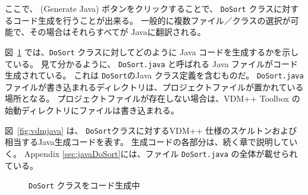 \documentclass[\pformat,11pt]{jarticle}
\newcommand{\guicmd}[1]{{\sf #1}}
\begin{document}
ここで、 
(\guicmd{Generate Java}) ボタンをクリックすることで、 {\tt DoSort} クラスに対するコード生成を行うことが出来る。
一般的に複数ファイル／クラスの選択が可能で、その場合はそれらすべてが Javaに翻訳される。

図~\ref{fig:interpreter} では、{\tt DoSort} クラスに対してどのように Java コードを生成するかを示している。
見て分かるように、 {\tt  DoSort.java} と呼ばれる Java ファイルがコード生成されている。
これは {\tt DoSort}のJava クラス定義を含むものだ。
 {\tt DoSort.java} ファイルが書き込まれるディレクトリは、プロジェクトファイルが置かれている場所となる。
プロジェクトファイルが存在しない場合は、VDM++ Toolbox の始動ディレクトリにファイルは書き込まれる。

図~\ref{fig:vdmjava} は、 {\tt DoSort}クラスに対するVDM++ 仕様のスケルトンおよび相当するJava生成コードを表す。
生成コードの各部分は、続く章で説明していく。
Appendix \ref{sec:javaDoSort}には、ファイル {\tt DoSort.java} の全体が載せられている。
\begin{figure}[H]
\begin{center}
\mbox{}
\caption{{\tt DoSort} クラスをコード生成中}\label{fig:interpreter}
\end{center}
\end{figure}
\end{document}
